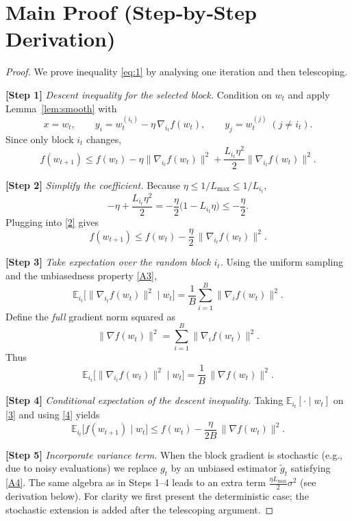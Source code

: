 \documentclass{article}
\begin{document}
\section*{Main Proof (Step‑by‑Step Derivation)}
\renewcommand{\theequation}{\arabic{equation}}
\setcounter{equation}{0}
\begin{proof}
We prove inequality \eqref{eq:1} by analysing one iteration and then telescoping.

\bigskip
\noindent\textbf{[Step 1]} \emph{Descent inequality for the selected block.}  
Condition on $w_t$ and apply Lemma~\ref{lem:smooth} with
\[
x = w_t,\qquad y_i = w_t^{(i_t)} - \eta\,\nabla_{i_t}f(w_t),\qquad y_j = w_t^{(j)}\;(j\neq i_t).
\]
Since only block $i_t$ changes,
\[
f(w_{t+1}) \le f(w_t) - \eta\|\nabla_{i_t}f(w_t)\|^2 + \frac{L_{i_t}\eta^2}{2}\|\nabla_{i_t}f(w_t)\|^2 .
\tag{2}
\]

\noindent\textbf{[Step 2]} \emph{Simplify the coefficient.}  
Because $\eta\le 1/L_{\max}\le 1/L_{i_t}$,
\[
-\eta + \frac{L_{i_t}\eta^2}{2}
= -\frac{\eta}{2}\Big(1 - L_{i_t}\eta\Big)
\le -\frac{\eta}{2}.
\]
Plugging into \eqref{2} gives
\[
f(w_{t+1}) \le f(w_t) - \frac{\eta}{2}\,\|\nabla_{i_t}f(w_t)\|^2 .
\tag{3}
\]

\noindent\textbf{[Step 3]} \emph{Take expectation over the random block $i_t$.}  
Using the uniform sampling and the unbiasedness property \ref{A3},
\[
\mathbb{E}_{i_t}\!\big[\|\nabla_{i_t}f(w_t)\|^2\mid w_t\big]
= \frac1B\sum_{i=1}^B\|\nabla_i f(w_t)\|^2 .
\]
Define the \emph{full} gradient norm squared as
\[
\|\nabla f(w_t)\|^2 = \sum_{i=1}^B\|\nabla_i f(w_t)\|^2 .
\]
Thus
\[
\mathbb{E}_{i_t}\!\big[\|\nabla_{i_t}f(w_t)\|^2\mid w_t\big]
= \frac{1}{B}\,\|\nabla f(w_t)\|^2 .
\tag{4}
\]

\noindent\textbf{[Step 4]} \emph{Conditional expectation of the descent inequality.}  
Taking $\mathbb{E}_{i_t}[\cdot\mid w_t]$ on \eqref{3} and using \eqref{4} yields
\[
\mathbb{E}_{i_t}\!\big[f(w_{t+1})\mid w_t\big]
\le
f(w_t) - \frac{\eta}{2B}\,\|\nabla f(w_t)\|^2 .
\tag{5}
\]

\noindent\textbf{[Step 5]} \emph{Incorporate variance term.}  
When the block gradient is stochastic (e.g., due to noisy evaluations) we replace $g_t$ by an unbiased estimator $\tilde g_t$ satisfying \ref{A4}. The same algebra as in Steps 1–4 leads to an extra term $\frac{\eta L_{\max}}{2}\sigma^2$ (see derivation below). For clarity we first present the deterministic case; the stochastic extension is added after the telescoping argument.


\end{proof}
\end{document}

